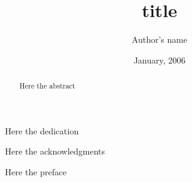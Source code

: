 \documentclass[12pt,american,VeneziaPhdThesis]{PhdThesis}[2004/02/17]%
\author{Author's name}
\title{title}
\date{January, 2006}
\begin{document}
\pagestyle{empty}
\maketitle
\begin{dedication}
Here the dedication
\end{dedication}
\begin{abstract}
    Here the abstract
\end{abstract}
\begin{acknowledgments}
Here the acknowledgments
\end{acknowledgments}

\frontmatter
{}
\pagestyle{serif}
\tableofcontents
\listoffigures
\listoftables

\begin{preface}
    Here the preface
\end{preface}



\mainmatter



% 

\backmatter

\appendix

\backmatter



\printindex%
\end{document}
